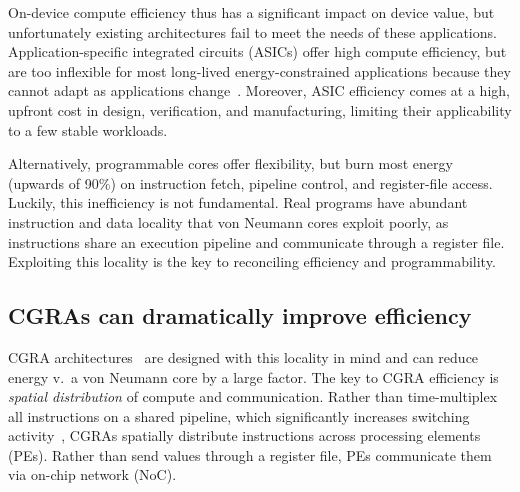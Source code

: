 On-device compute efficiency thus has a significant impact on device
value, but unfortunately existing architectures fail to meet the needs
of these applications.
%
Application-specific integrated circuits (ASICs) offer high compute
efficiency, but are too inflexible for most long-lived
energy-constrained applications because they cannot adapt as
applications change~\cite{hotmobile2021}.
%
Moreover, ASIC efficiency comes at a high, upfront cost in design,
verification, and manufacturing, limiting their applicability to a few
stable workloads.

Alternatively, programmable cores offer flexibility, but burn most energy
(upwards of 90\%)
on instruction fetch, pipeline control, and register-file access.
%
Luckily, this inefficiency is not fundamental.
%
Real programs have abundant instruction and data locality that von
Neumann cores exploit poorly, as instructions share an execution
pipeline and communicate through a register file.
%
%
Exploiting this locality is the key to reconciling efficiency and programmability.



\subsection{CGRAs can dramatically improve efficiency}

CGRA architectures~\cite{remarc,adres,matrix,dyser,revamp,opencgra,cgrame,wave,nguyen2021fifer,morphosys,mozart,ppa,fpca,plasticine,dadu2019towards,parashar2013triggered,capstan,nowatzki:isca17:stream-dataflow,goldstein2000piperench,trips,weng2020dsagen,weng2020hybrid,voitsechov2014single,mishra2006tartan,tan2018stitch,karunaratne2017hycube,voitsechov2018inter,evx,torng2021ultra}
are designed with this locality in mind and
can reduce energy v.\ a von Neumann core by a large factor.
%
The key to CGRA efficiency is \emph{spatial distribution} of compute and communication.
%
Rather than time-multiplex all instructions on a shared pipeline,
which significantly increases switching activity~\cite{snafu},
CGRAs spatially distribute instructions across processing elements (PEs).
%
Rather than send values through a register file,
PEs communicate them via on-chip network (NoC).

